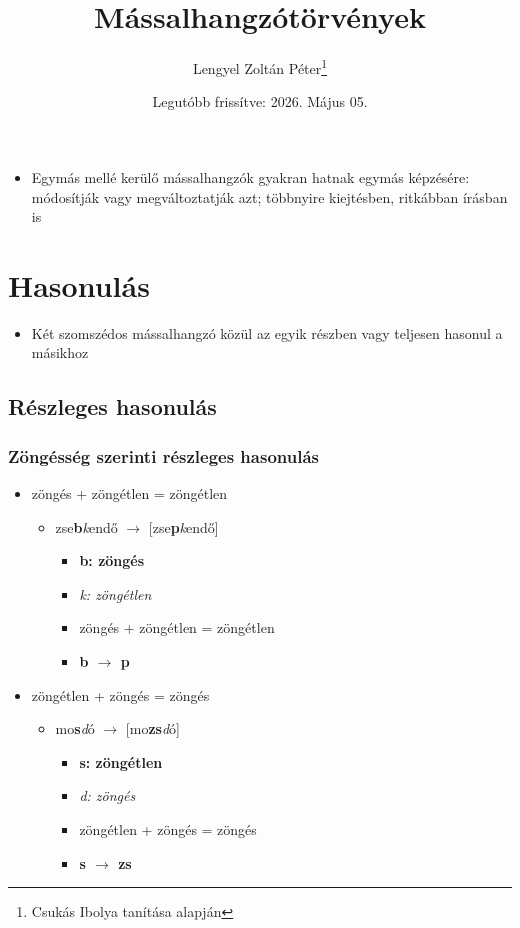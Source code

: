 \documentclass{article}
\title{Mássalhangzótörvények}
\author{Lengyel Zoltán Péter\thanks{Csukás Ibolya tanítása alapján}}
\date{Legutóbb frissítve: 2026. Május 05.}
\begin{document}
\maketitle
\tableofcontents
\newpage

\begin{itemize}
    \item Egymás mellé kerülő mássalhangzók gyakran hatnak egymás képzésére: módosítják vagy megváltoztatják azt; többnyire kiejtésben, ritkábban írásban is
\end{itemize}

\section{Hasonulás}
\begin{itemize}
    \item Két szomszédos mássalhangzó közül az egyik részben vagy teljesen hasonul a másikhoz
\end{itemize}

\subsection{Részleges hasonulás}
\subsubsection{Zöngésség szerinti részleges hasonulás}

\begin{itemize}
    \item zöngés + zöngétlen = zöngétlen  \begin{itemize}
     \item zse\textbf{b}\textit{k}endő $\rightarrow$ [zse\textbf{p}\textit{k}endő] \begin{itemize}
         \item \textbf{b: zöngés} 
         \item \textit{k: zöngétlen}
         \item zöngés + zöngétlen = zöngétlen
         \item \textbf{b $\rightarrow$ p}
     \end{itemize}
 \end{itemize}

    \item zöngétlen + zöngés = zöngés
     \begin{itemize}
     \item mo\textbf{s}\textit{d}ó $\rightarrow$ [mo\textbf{zs}\textit{d}ó] \begin{itemize}
         \item \textbf{s: zöngétlen} 
         \item \textit{d: zöngés}
         \item zöngétlen + zöngés = zöngés
         \item \textbf{s $\rightarrow$ zs}
     \end{itemize}
 \end{itemize}
\end{itemize}
\end{document}
